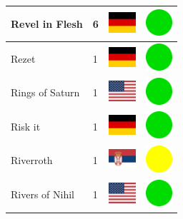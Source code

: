 \documentclass[12pt, a4paper, twoside]{report}
\begin{document}
\begin{center}
\begin{longtable}{|p{5cm}|p{2cm}|p{2cm}|p{2cm}|}
			Revel in Flesh & 6 & \includegraphics[width=1cm]{4x3/de} & \includegraphics[width=1cm]{likes/y} \\ \hline
			Rezet & 1 & \includegraphics[width=1cm]{4x3/de} & \includegraphics[width=1cm]{likes/y} \\ \hline
			Rings of Saturn & 1 & \includegraphics[width=1cm]{4x3/us} & \includegraphics[width=1cm]{likes/y} \\ \hline
			Risk it & 1 & \includegraphics[width=1cm]{4x3/de} & \includegraphics[width=1cm]{likes/y} \\ \hline
			Riverroth & 1 & \includegraphics[width=1cm]{4x3/rs} & \includegraphics[width=1cm]{likes/m} \\ \hline
			Rivers of Nihil & 1 & \includegraphics[width=1cm]{4x3/us} & \includegraphics[width=1cm]{likes/y} \\ \hline

\end{longtable}
\end{center}
\end{document}
